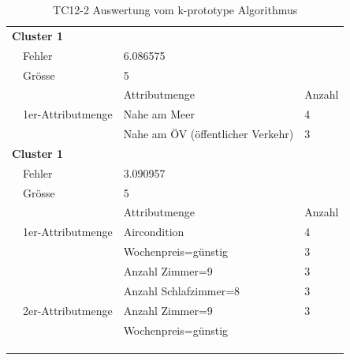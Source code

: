 \begin{longtable}{ | l | l | l | l |}
	\multicolumn{4}{|l|}{\textbf{Cluster 1}} \\ \cline{2-4}
	& Fehler & \multicolumn{2}{|l|}{6.086575} \\ \cline{2-4}  
	& Grösse & \multicolumn{2}{|l|}{5} \\ \cline{2-4} 
	&& Attributmenge & Anzahl \\ \cline{2-4} 
	
	& 1er-Attributmenge & \tabitem Nahe am Meer & 4 \\ \cline{2-4}
	& & \tabitem Nahe am ÖV (öffentlicher Verkehr) & 3 \\ \hline
		
	\multicolumn{4}{|l|}{\textbf{Cluster 1}} \\ \cline{2-4} 
	& Fehler & \multicolumn{2}{|l|}{3.090957} \\ \cline{2-4} 
	& Grösse & \multicolumn{2}{|l|}{5} \\ \cline{2-4} 
	&& Attributmenge & Anzahl \\ \cline{2-4} 
	
	& 1er-Attributmenge & \tabitem Aircondition & 4 \\ \cline{3-4} 
	& & \tabitem Wochenpreis=günstig & 3 \\ \cline{3-4} 
	& & \tabitem Anzahl Zimmer=9 & 3 \\ \cline{3-4} 
	& & \tabitem Anzahl Schlafzimmer=8 & 3 \\ \cline{2-4} 
	
	& 2er-Attributmenge & \tabitem Anzahl Zimmer=9 & 3 \\
	& & \tabitem Wochenpreis=günstig & \\ \hline
		
	\rowcolor{tableheadcolor}
	\multicolumn{4}{|l|}{\bfseries Testergebnis} \\ \hline 
	\multicolumn{4}{|l|}{\cellcolor{green!25}} \\ \hline 
		
	\caption{TC12-2 Auswertung vom k-prototype Algorithmus}
	\centering
	\label{fig:testingfazit:testing:testcases:12:2}
\end{longtable}
